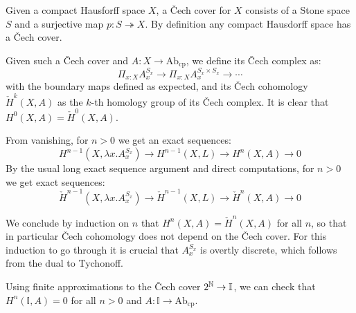 \documentclass{../util/zariski}
\begin{document}
Given a compact Hausforff space $X$, a \v{C}ech cover for $X$ consists of a Stone space $S$ and a surjective map $p:S\twoheadrightarrow X$. By definition any compact Hausdorff space has a \v{C}ech cover.

Given such a \v{C}ech cover and $A:X\to \mathrm{Ab}_{\mathrm{cp}}$, we define its \v{C}ech complex as:
\[\Pi_{x:X}A_x^{S_x} \to \Pi_{x:X}A_x^{S_x\times S_x} \to \cdots\]
with the boundary maps defined as expected, and its \v{C}ech cohomology $\check{H}^k(X,A)$ as the $k$-th homology group of its \v{C}ech complex. It is clear that $H^0(X,A) = \check{H}^0(X,A)$.

From vanishing, for $n>0$ we get an exact sequences:
\[H^{n-1}(X,\lambda x.A_x^{S_x}) \to H^{n-1}(X,L)\to H^n(X,A)\to 0\]
By the usual long exact sequence argument and direct computations, for $n>0$ we get exact sequences:
\[\check{H}^{n-1}(X,\lambda x.A_x^{S_x}) \to \check{H}^{n-1}(X,L)\to \check{H}^n(X,A)\to 0\]

We conclude by induction on $n$ that $H^n(X,A) = \check{H}^n(X,A)$ for all $n$, so that in particular \v{C}ech cohomology does not depend on the \v{C}ech cover. For this induction to go through it is crucial that $A_x^{S_x}$ is overtly discrete, which follows from the dual to Tychonoff.

Using finite approximations to the \v{C}ech cover $2^{\mathbb{N}}\to \mathbb{I}$, we can check that $H^n(\mathbb{I},A) = 0$ for all $n>0$ and $A:\mathbb{I}\to \mathrm{Ab}_{\mathrm{cp}}$.

\printbibliography
\end{document}
